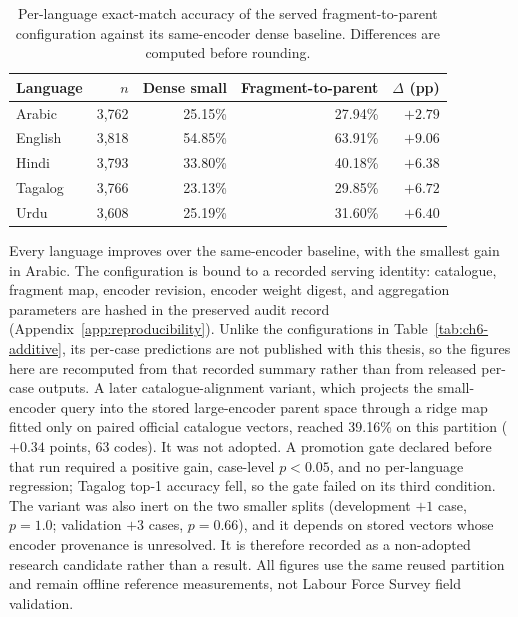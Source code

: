 \begin{table}[htbp]
\centering
\caption{Per-language exact-match accuracy of the served fragment-to-parent
configuration against its same-encoder dense baseline. Differences are
computed before rounding.}
\label{tab:ch6-parent-perlang}
\small\renewcommand{\arraystretch}{1.3}
\begin{tabular}{lrrrr}
\toprule
\textbf{Language} & \textbf{$n$} & \textbf{Dense small} & \textbf{Fragment-to-parent} & \textbf{$\Delta$ (pp)} \\
\midrule
Arabic & 3,762 & 25.15\% & 27.94\% & $+2.79$ \\
English & 3,818 & 54.85\% & 63.91\% & $+9.06$ \\
Hindi & 3,793 & 33.80\% & 40.18\% & $+6.38$ \\
Tagalog & 3,766 & 23.13\% & 29.85\% & $+6.72$ \\
Urdu & 3,608 & 25.19\% & 31.60\% & $+6.40$ \\
\bottomrule
\end{tabular}
\end{table}

Every language improves over the same-encoder baseline, with the smallest
gain in Arabic. The configuration is bound to a recorded serving identity:
catalogue, fragment map, encoder revision, encoder weight digest, and
aggregation parameters are hashed in the preserved audit record
(Appendix~\ref{app:reproducibility}). Unlike the configurations in
Table~\ref{tab:ch6-additive}, its per-case predictions are not published
with this thesis, so the figures here are recomputed from that recorded
summary rather than from released per-case outputs. A later catalogue-alignment variant, which projects the small-encoder
query into the stored large-encoder parent space through a ridge map
fitted only on paired official catalogue vectors, reached 39.16\% on this
partition ($+0.34$ points, 63 codes). It was not adopted. A promotion gate
declared before that run required a positive gain, case-level
$p<0.05$, and no per-language regression; Tagalog top-1 accuracy fell, so
the gate failed on its third condition. The variant was also inert on the
two smaller splits (development $+1$ case, $p=1.0$; validation $+3$ cases,
$p=0.66$), and it depends on stored vectors whose encoder provenance is
unresolved. It is therefore recorded as a non-adopted research candidate
rather than a result. All figures use the same reused partition and remain offline
reference measurements, not Labour Force Survey field validation.

